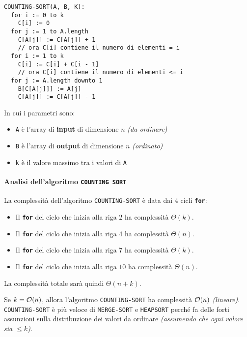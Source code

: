 \documentclass[italian, 10pt]{article}
\begin{document}
\begin{lstlisting}[style=pseudocode, caption={Pseudocodice algorimo \texttt{COUNTING-SORT}}, label={lst:counting-sort}]
COUNTING-SORT(A, B, K):
  for i := 0 to k
    C[i] := 0
  for j := 1 to A.length
    C[A[j]] := C[A[j]] + 1
    // ora C[i] contiene il numero di elementi = i
  for i := 1 to k
    C[i] := C[i] + C[i - 1]
    // ora C[i] contiene il numero di elementi <= i
  for j := A.length downto 1
    B[C[A[j]]] := A[j]
    C[A[j]] := C[A[j]] - 1
\end{lstlisting}

In cui i parametri sono:

\begin{itemize}
  \item \texttt{A} è l'array di \textbf{input} di dimensione \(n\) \textit{(da ordinare)}
  \item \texttt{B} è l'array di \textbf{output} di dimensione \(n\) \textit{(ordinato)}
  \item \texttt{k} è il valore massimo tra i valori di \texttt{A}
\end{itemize}

\paragraph{Analisi dell'algoritmo \texttt{COUNTING SORT}}

La complessità dell'algoritmo \texttt{COUNTING-SORT} è data dai \(4\) cicli \textbf{\texttt{for}}:

\begin{itemize}
  \item Il \textbf{\texttt{for}} del ciclo che inizia alla riga \(2\) ha complessità \(\Theta(k)\).
  \item Il \textbf{\texttt{for}} del ciclo che inizia alla riga \(4\) ha complessità \(\Theta(n)\).
  \item Il \textbf{\texttt{for}} del ciclo che inizia alla riga \(7\) ha complessità \(\Theta(k)\).
  \item Il \textbf{\texttt{for}} del ciclo che inizia alla riga \(10\) ha complessità \(\Theta(n)\).
\end{itemize}

La complessità totale sarà quindi \(\Theta(n+k)\).

Se \(k = \mathcal{O}(n)\), allora l'algoritmo \texttt{COUNTING-SORT} ha complessità \(\mathcal{O}(n)\) \textit{(lineare)}.
\texttt{COUNTING-SORT} è più veloce di \texttt{MERGE-SORT} e \texttt{HEAPSORT} perché fa delle forti assunzioni sulla distribuzione dei valori da ordinare \textit{(assumendo che ogni valore sia \(\leq k\))}.
\end{document}
